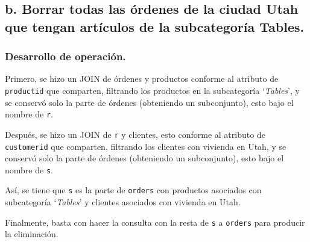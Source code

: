 \subsection*{b. Borrar todas las órdenes de la ciudad Utah que tengan artículos de la subcategoría Tables.}
\subsubsection*{Desarrollo de operación.}
Primero, se hizo un JOIN de órdenes y productos conforme al atributo de \texttt{productid} que comparten, filtrando los productos en la subcategoría `\textit{Tables}', y se conservó solo la parte de órdenes (obteniendo un subconjunto), esto bajo el nombre de \texttt{r}.

Después, se hizo un JOIN de \texttt{r} y clientes, esto conforme al atributo de \texttt{customerid} que comparten, filtrando los clientes con vivienda en Utah, y se conservó solo la parte de órdenes (obteniendo un subconjunto), esto bajo el nombre de \texttt{s}.

Así, se tiene que \texttt{s} es la parte de \texttt{orders} con productos asociados con subcategoría `\textit{Tables}' y clientes asociados con vivienda en Utah.

Finalmente, basta con hacer la consulta con la resta de \texttt{s} a \texttt{orders} para producir la eliminación.


